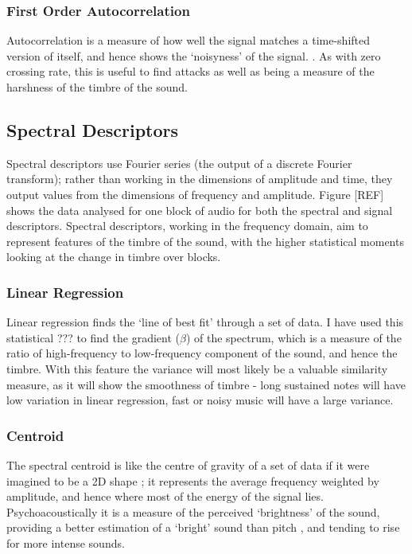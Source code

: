 \subsubsection{First Order Autocorrelation}

Autocorrelation is a measure of how well the signal matches a time-shifted version of itself, and hence shows the `noisyness' of the signal. \citep{Wikipedia2007}. As with zero crossing rate, this is useful to find attacks as well as being a measure of the harshness of the timbre of the sound.
\subsection{Spectral Descriptors}
Spectral descriptors use Fourier series (the output of a discrete Fourier transform); rather than working in the dimensions of amplitude and time, they output values from the dimensions of frequency and amplitude. Figure [REF] shows the data analysed for one block of audio for both the spectral and signal descriptors. Spectral descriptors, working in the frequency domain, aim to represent features of the timbre of the sound, with the higher statistical moments looking at the change in timbre over blocks.
\subsubsection{Linear Regression}

Linear regression finds the `line of best fit' through a set of data. I have used this statistical ??? to find the gradient ($\beta$) of the spectrum, which is a measure of the ratio of high-frequency to low-frequency component of the sound, and hence the timbre. With this feature the variance will most likely be a valuable similarity measure, as it will show the smoothness of timbre - long sustained notes will have low variation in linear regression, fast or noisy music will have a large variance.
\subsubsection{Centroid}

The spectral centroid is like the centre of gravity of a set of data if it were imagined to be a 2D shape \citep{Park2004}; it represents the average frequency weighted by amplitude, and hence where most of the energy of the signal lies. Psychoacoustically it is a measure of the perceived `brightness' of the sound, providing a better estimation of a `bright' sound than pitch \citep{Schubert2004}, and tending to rise for more intense sounds.
